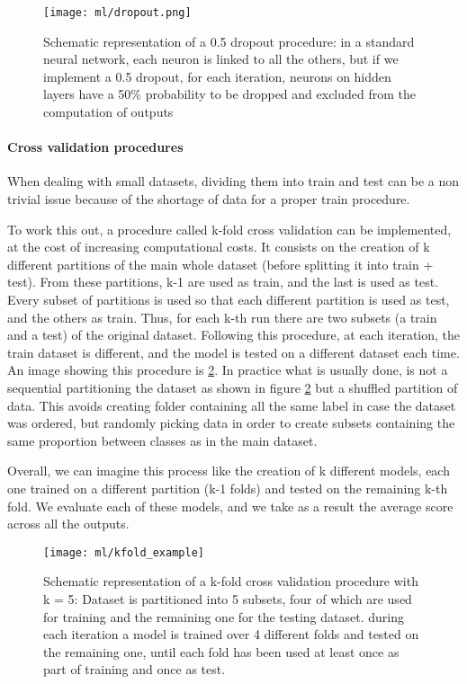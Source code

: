 \documentclass[11pt]{report}
\begin{document}
\begin{figure}
\centering
\texttt{[image: ml/dropout.png]}
\caption{Schematic representation of a 0.5 dropout procedure: in a standard neural network, each neuron is linked to all the others, but if we implement a 0.5 dropout, for each iteration, neurons on hidden layers have a 50\% probability to be dropped and excluded from the computation of outputs}
\label{fig:dropout}
\end{figure}

\paragraph{Cross validation procedures} \hfill

\noindent When dealing with small datasets, dividing them into train and test can be a non trivial issue because of the shortage of data for a proper train procedure.

To work this out, a procedure called k-fold cross validation can be implemented, at the cost of increasing computational costs.
It consists on the creation of k different partitions of the main whole dataset (before splitting it into train + test).
From these partitions, k-1 are used as train, and the last is used as test.
Every subset of partitions is used so that each different partition is used as test, and the others as train.
Thus, for each k-th run there are two subsets (a train and a test) of the original dataset.
Following this procedure, at each iteration, the train dataset is different, and the model is tested on a different dataset each time.
An image showing this procedure is \ref{fig:kfold}.
In practice what is usually done, is not a sequential partitioning the dataset as shown in figure \ref{fig:kfold} but a shuffled partition of data.
This avoids creating folder containing all the same label in case the dataset was ordered, but randomly picking data in order to create subsets containing the same proportion between classes as in the main dataset.

Overall, we can imagine this process like the creation of k different models, each one trained on a different partition (k-1 folds) and tested on the remaining k-th fold.
We evaluate each of these models, and we take as a result the average score across all the outputs.


\begin{figure}
\centering
\texttt{[image: ml/kfold\_example]}
\caption{Schematic representation of a k-fold cross validation procedure with k = 5: Dataset is partitioned into 5 subsets, four of which are used for training and the remaining one for the testing dataset. during each iteration a model is trained over 4 different folds and tested on the remaining one, until each fold has been used at least once as part of training and once as test.
}
\label{fig:kfold}
\end{figure}
\end{document}

